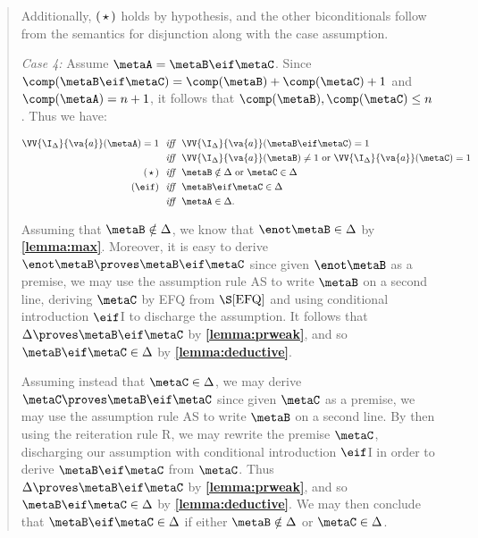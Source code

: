 \begin{quote}
  Additionally, $(\hspace{1.6pt}\star\hspace{1.6pt})$ holds by hypothesis, and the other biconditionals follow from the semantics for disjunction along with the case assumption.

  \textit{Case 4:}
  Assume $\metaA=\metaB\eif\metaC$.
  Since $\comp(\metaB\eif\metaC)=\comp(\metaB)+\comp(\metaC)+1$ and  $\comp(\metaA)=n+1$, it follows that $\comp(\metaB),\comp(\metaC)\leq n$.
  Thus we have:

  \vspace{-.2in}
  \begin{align*}
    \VV{\I_\Delta}{\va{a}}(\metaA)=1 &\textit{ ~iff~ } \VV{\I_\Delta}{\va{a}}(\metaB\eif\metaC)=1\\
      &\textit{ ~iff~ } \VV{\I_\Delta}{\va{a}}(\metaB)\neq 1 \text{ or } \VV{\I_\Delta}{\va{a}}(\metaC)=1 \\
      (\hspace{1.6pt}\star\hspace{1.6pt}) &\textit{ ~iff~ } \metaB\notin\Delta \text{ or } \metaC\in\Delta \\
      (\eif) &\textit{ ~iff~ } \metaB\eif\metaC\in\Delta \\
      &\textit{ ~iff~ } \metaA\in\Delta.
  \end{align*}

  Assuming that $\metaB\notin\Delta$, we know that $\enot\metaB\in\Delta$ by \textbf{\ref{lemma:max}}.
  Moreover, it is easy to derive $\enot\metaB\proves\metaB\eif\metaC$ since given $\enot\metaB$ as a premise, we may use the assumption rule AS to write $\metaB$ on a second line, deriving $\metaC$ by EFQ from $\S\ref{EFQ}$ and using conditional introduction $\eif$I to discharge the assumption.
  It follows that $\Delta\proves\metaB\eif\metaC$ by \textbf{\ref{lemma:prweak}}, and so $\metaB\eif\metaC\in\Delta$ by \textbf{\ref{lemma:deductive}}.

  Assuming instead that $\metaC\in\Delta$, we may derive $\metaC\proves\metaB\eif\metaC$ since given $\metaC$ as a premise, we may use the assumption rule AS to write $\metaB$ on a second line.
  By then using the reiteration rule R, we may rewrite the premise $\metaC$, discharging our assumption with conditional introduction $\eif$I in order to derive $\metaB\eif\metaC$ from $\metaC$. 
  Thus $\Delta\proves\metaB\eif\metaC$ by \textbf{\ref{lemma:prweak}}, and so $\metaB\eif\metaC\in\Delta$ by \textbf{\ref{lemma:deductive}}.
  We may then conclude that $\metaB\eif\metaC\in\Delta$ if either $\metaB\notin\Delta$ or $\metaC\in\Delta$.


\end{quote}
